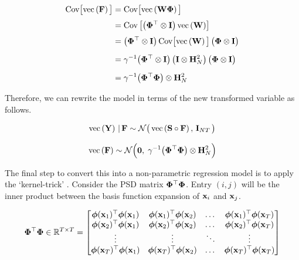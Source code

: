 \begin{align*}
    \text{Cov}\big[\text{\textup{vec}}\left(\mathbf{F}\right)\big] &= \text{Cov}\big[\text{\textup{vec}}\left(\mathbf{W} \mathbf{\Phi}\right)\big] \\[0.1cm]
    &= \text{Cov}\left[\big(\mathbf{\Phi}^\top \otimes \mathbf{I}\big) \, \text{\textup{vec}}\left(\mathbf{W}\right)\right] \\[0.1cm]
    &= \big(\mathbf{\Phi}^\top \otimes \mathbf{I}\big) \, \text{Cov}\big[\text{\textup{vec}}\left(\mathbf{W}\right)\big] \, \big(\mathbf{\Phi} \otimes \mathbf{I}\big) \\[0.2cm]
    &= \gamma^{-1}  \big(\mathbf{\Phi}^\top \otimes \mathbf{I}\big) \, \big(\mathbf{I} \otimes \mathbf{H}_N^{2} \big) \, \big(\mathbf{\Phi} \otimes \mathbf{I}\big) \\[0.2cm]
    &= \gamma^{-1} \big( \mathbf{\Phi}^\top \mathbf{\Phi} \big) \otimes \mathbf{H}_N^2
\end{align*}

Therefore, we can rewrite the model in terms of the new transformed variable as follows. 

\begin{equation}
    \text{\textup{vec}}\left(\mathbf{Y}\right) \, | \, \mathbf{F} \sim \mathcal{N}\big(\, \text{\textup{vec}}\left(\mathbf{S} \circ \mathbf{F}\right), \, \mathbf{I}_{NT} \, \big)
\end{equation}

\begin{equation}
    \label{eq:F_prior2}
    \text{\textup{vec}}\left(\mathbf{F}\right) \sim \mathcal{N}\Big(\mathbf{0}, \; \gamma^{-1} \big(\mathbf{\Phi}^\top \mathbf{\Phi} \big) \otimes \mathbf{H}_N^{2}\Big)
\end{equation}


The final step to convert this into a non-parametric regression model is to apply the `kernel-trick' \citep{Scholkopf2018}. Consider the PSD matrix $\mathbf{\Phi}^\top \mathbf{\Phi}$. Entry $(i, j)$ will be the inner product between the basis function expansion of $\mathbf{x}_i$ and $\mathbf{x}_j$. 

\begin{equation}
    \mathbf{\Phi}^\top \mathbf{\Phi} \in \mathbb{R}^{T \times T} = 
    \begin{bmatrix} 
        \boldsymbol{\phi}(\mathbf{x}_1)^\top\boldsymbol{\phi}(\mathbf{x}_1) & \boldsymbol{\phi}(\mathbf{x}_1)^\top\boldsymbol{\phi}(\mathbf{x}_2) & \dots & \boldsymbol{\phi}(\mathbf{x}_1)^\top\boldsymbol{\phi}(\mathbf{x}_T) \\
        \boldsymbol{\phi}(\mathbf{x}_2)^\top\boldsymbol{\phi}(\mathbf{x}_1) & \boldsymbol{\phi}(\mathbf{x}_2)^\top\boldsymbol{\phi}(\mathbf{x}_2) & \dots & \boldsymbol{\phi}(\mathbf{x}_2)^\top\boldsymbol{\phi}(\mathbf{x}_T) \\
        \vdots & \vdots & \ddots & \vdots  \\
        \boldsymbol{\phi}(\mathbf{x}_T)^\top\boldsymbol{\phi}(\mathbf{x}_1) & \boldsymbol{\phi}(\mathbf{x}_T)^\top\boldsymbol{\phi}(\mathbf{x}_2) & \dots & \boldsymbol{\phi}(\mathbf{x}_T)^\top\boldsymbol{\phi}(\mathbf{x}_T) \\
    \end{bmatrix}
\end{equation}

